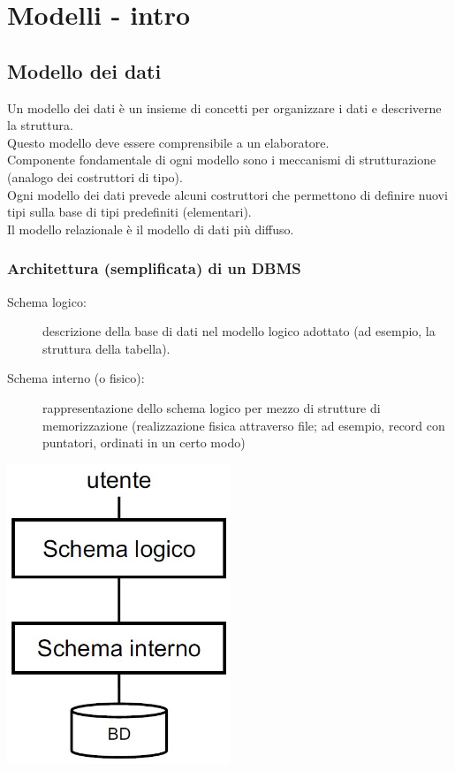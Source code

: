 \chapter{Modelli - intro}
\section{Modello dei dati}
Un modello dei dati è un insieme di concetti per organizzare i dati e descriverne la struttura.
\\Questo modello deve essere comprensibile a un elaboratore.
\\Componente fondamentale di ogni modello sono i meccanismi di strutturazione (analogo dei costruttori di tipo).
\\Ogni modello dei dati prevede alcuni costruttori che permettono di definire nuovi tipi sulla base di tipi predefiniti (elementari).
\\Il modello relazionale è il modello di dati più diffuso.

\subsection{Architettura (semplificata) di un DBMS}
\begin{description}
    \item[Schema logico:] descrizione della base di dati nel modello logico adottato (ad esempio, la struttura della tabella).
    \item[Schema interno (o fisico):] rappresentazione dello schema logico per mezzo di strutture di memorizzazione (realizzazione fisica attraverso file; ad esempio, record con puntatori, ordinati in un certo modo)
\end{description}
\begin{center}
    \includegraphics[width=0.5\textwidth]{chaptersLezioniSara/img/MR_intro2.jpg}
\end{center}

